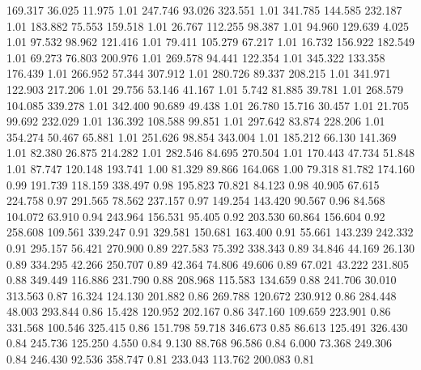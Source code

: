  169.317   36.025   11.975         1.01
 247.746   93.026  323.551         1.01
 341.785  144.585  232.187         1.01
 183.882   75.553  159.518         1.01
  26.767  112.255   98.387         1.01
  94.960  129.639    4.025         1.01
  97.532   98.962  121.416         1.01
  79.411  105.279   67.217         1.01
  16.732  156.922  182.549         1.01
  69.273   76.803  200.976         1.01
 269.578   94.441  122.354         1.01
 345.322  133.358  176.439         1.01
 266.952   57.344  307.912         1.01
 280.726   89.337  208.215         1.01
 341.971  122.903  217.206         1.01
  29.756   53.146   41.167         1.01
   5.742   81.885   39.781         1.01
 268.579  104.085  339.278         1.01
 342.400   90.689   49.438         1.01
  26.780   15.716   30.457         1.01
  21.705   99.692  232.029         1.01
 136.392  108.588   99.851         1.01
 297.642   83.874  228.206         1.01
 354.274   50.467   65.881         1.01
 251.626   98.854  343.004         1.01
 185.212   66.130  141.369         1.01
  82.380   26.875  214.282         1.01
 282.546   84.695  270.504         1.01
 170.443   47.734   51.848         1.01
  87.747  120.148  193.741         1.00
  81.329   89.866  164.068         1.00
  79.318   81.782  174.160         0.99
 191.739  118.159  338.497         0.98
 195.823   70.821   84.123         0.98
  40.905   67.615  224.758         0.97
 291.565   78.562  237.157         0.97
 149.254  143.420   90.567         0.96
  84.568  104.072   63.910         0.94
 243.964  156.531   95.405         0.92
 203.530   60.864  156.604         0.92
 258.608  109.561  339.247         0.91
 329.581  150.681  163.400         0.91
  55.661  143.239  242.332         0.91
 295.157   56.421  270.900         0.89
 227.583   75.392  338.343         0.89
  34.846   44.169   26.130         0.89
 334.295   42.266  250.707         0.89
  42.364   74.806   49.606         0.89
  67.021   43.222  231.805         0.88
 349.449  116.886  231.790         0.88
 208.968  115.583  134.659         0.88
 241.706   30.010  313.563         0.87
  16.324  124.130  201.882         0.86
 269.788  120.672  230.912         0.86
 284.448   48.003  293.844         0.86
  15.428  120.952  202.167         0.86
 347.160  109.659  223.901         0.86
 331.568  100.546  325.415         0.86
 151.798   59.718  346.673         0.85
  86.613  125.491  326.430         0.84
 245.736  125.250    4.550         0.84
   9.130   88.768   96.586         0.84
   6.000   73.368  249.306         0.84
 246.430   92.536  358.747         0.81
 233.043  113.762  200.083         0.81
